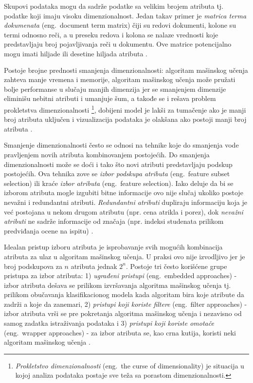 \documentclass[12pt,oneside]{memoir}
\begin{document}
Skupovi podataka mogu da sadrže podatke sa velikim brojem atributa tj. podatke koji imaju visoku dimenzionalnost. Jedan takav primer je \textit{matrica terma dokumenata} (eng.~document term matrix) čiji su redovi dokumenti, kolone su termi odnosno reči, a u preseku redova i kolona se nalaze vrednosti koje predstavljaju broj pojavljivanja reči u dokumentu. Ove matrice potencijalno mogu imati hiljade ili desetine hiljada atributa \cite{mitic}. 

Postoje brojne prednosti smanjenja dimenzionalnosti: algoritam mašinskog učenja zahteva manje vremena i memorije, algoritam mašinskog učenja može pružati bolje performanse u slučaju manjih dimenzija jer se smanjenjem dimenzije eliminišu nebitni atributi i umanjuje šum, a takođe se i rešava problem prokletstva dimenzionalnosti \footnote{\textit{Prokletstvo dimenzionalnosti} (eng.~the curse of dimensionality) je situacija u kojoj analiza podataka postaje sve teža sa porastom dimenzionalnosti.}, dobijeni model je lakši za tumačenje ako je manji broj atributa uključen i vizualizacija podataka je olakšana ako postoji manji broj atributa \cite{mitic, UMLFTA}.

Smanjenje dimenzionalnosti često se odnosi na tehnike koje do smanjenja vode pravljenjem novih atributa kombinovanjem postojećih. Do smanjenja dimenzionalnosti može se doći i tako što novi atributi predstavljaju podskup postojećih. Ova tehnika zove se \textit{izbor podskupa atributa} (eng.~feature subset selection) ili kraće \textit{izbor atributa} (eng.~feature selection). Iako deluje da bi se izborom atributa mogle izgubiti bitne informacije ovo nije slučaj ukoliko postoje nevažni i redundantni atributi. \textit{Redundantni atributi} dupliraju informaciju koja je već postojana u nekom drugom atributu (npr. cena atrikla i porez), dok \textit{nevažni atributi} ne sadrže informacije od značaja (npr. indeksi studenata prilikom predviđanja ocene na ispitu) \cite{mitic}. 

Idealan pristup izboru atributa je isprobavanje svih mogućih kombinacija atributa za ulaz u algoritam mašinskog učenja. U praksi ovo nije izvodljivo jer je broj podskupova za $n$ atributa jednak $2^n$. Postoje tri često korišćene grupe pristupa za izbor atributa: 1) \textit{ugrađeni pristupi} (eng.~embedded approaches) - izbor atributa dešava se prilikom izvršavanja algoritma mašinskog učenja tj. prilikom obučavanja klasifikacionog modela kada algoritam bira koje atribute da zadrži a koje da zanemari, 2) \textit{pristupi koji koriste filtere} (eng.~filter approaches) - izbor atributa vrši se pre pokretanja algoritma mašinskog učenja i nezavisno od samog zadatka istraživanja podataka i 3) \textit{pristupi koji koriste omotače} (eng.~wrapper approaches) - za izbor atributa se, kao crna kutija, koristi neki algoritam mašinskog učenja \cite{mitic, UMLFTA, aggarwal}.
\end{document}
